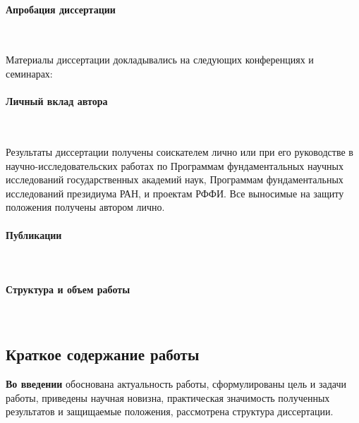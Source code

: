 \documentclass[a4paper,14pt]{extarticle}                     %
\theoremstyle{plain}                                         %
\begin{document}
\paragraph{Апробация диссертации} \

Материалы диссертации докладывались на следующих конференциях и семинарах:
\begin{itemize}[noitemsep,topsep=0pt,parsep=0pt,partopsep=0pt]

\end{itemize}

\paragraph{Личный вклад автора} \

Результаты диссертации получены соискателем лично или при его руководстве в научно-исследовательских работах по Программам фундаментальных научных исследований государственных академий наук, Программам фундаментальных исследований президиума РАН, и проектам РФФИ.
Все выносимые на защиту положения получены автором лично.

\paragraph{Публикации} \



\paragraph{Структура и объем работы} \




\newpage
\subsection*{Краткое содержание работы}

\textbf{Во введении} обоснована актуальность работы, сформулированы цель и задачи работы, приведены научная новизна, практическая значимость полученных результатов и защищаемые положения, рассмотрена структура диссертации. 



\end{document}
